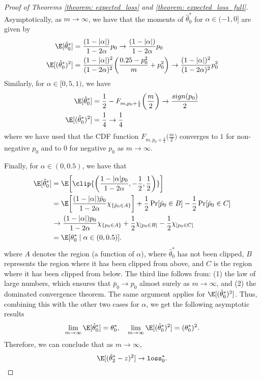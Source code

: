 \begin{proof}[Proof of Theorems \ref{theorem: expected_loss} and \ref{theorem:
    expected_loss_full}]
    Asymptotically, as $m \to \infty$, we have that the moments of
    $\hat{\theta}_0^\ast$ for $\alpha \in (-1, 0]$ are given by
    \begin{align*}
        \E[\hat{\theta}_0^\ast] &= \frac{(1-|\alpha|)}{1-2\alpha} p_0 \to
        \frac{(1-|\alpha|)}{1-2\alpha} p_0\\
        \E[(\hat{\theta}_0^\ast)^2] &= \frac{(1-|\alpha|)^2}{(1-2\alpha)^2}
        \bigg( \frac{0.25 - p_0^2}{m} +  p_0^2\bigg) \to
        \frac{(1-|\alpha|)^2}{(1-2\alpha)^2} p_0^2
    \end{align*}
    Similarly, for $\alpha \in [0,5, 1)$, we have 
    \begin{align*}
        \E[\hat{\theta}_0^\ast] &= \frac12 - F_{m, p_0 +
        \frac12}\bigg(\frac{m}{2}\bigg) \to \frac{sign(p_0)}{2}\\
        \E[(\hat{\theta}_0^\ast)^2] &= \frac14 \to \frac14
    \end{align*}
    where we have used that the CDF function $F_{m, p_0 +
    \frac12}\bigg(\frac{m}{2}\bigg)$ converges to $1$ for non-negative $p_0$
    and to $0$ for negative $p_0$ as $m\to \infty$.

    Finally, for $\alpha \in (0, 0.5)$, we have that 
    \begin{align*}
        \E[\hat{\theta}_0^\ast] &= \E\bigg[\clip{\bigg( \frac{1 - |\alpha|
        p_0}{1-2\alpha}, -\frac12, \frac12 \bigg)}\bigg]\\
        &= \E\bigg[ \frac{(1-|\alpha|)\bar{p}_0}{1-2\alpha}
        \chi_{\{\bar{p}_0 \in A\}} \bigg] + \frac12 \Pr[\bar{p}_0 \in
        B  ] - \frac{1}{2} \Pr[\bar{p}_0 \in C ]\\
        &\to \frac{(1-|\alpha|){p_0}}{1-2\alpha}  \chi_{\{{p_0} \in A\}} +
        \frac12 \chi_{[{p_0} \in B  ]} - \frac{1}{2} \chi_{[{p_0} \in C ]}\\
        &= \E[{\theta}_0^\ast \mid \alpha \in (0, 0.5)].
    \end{align*}
    where $A$ denotes the region (a function of $\alpha$), where
    $\hat{\theta}_0^\ast$ has not been clipped, $B$ represents the region where
    it has been clipped from above, and $C$ is the region where it has been
    clipped from below. The third line follows from: (1) the law of large
    numbers, which ensures that $\bar{p}_0 \to p_0$ almost surely as $m
    \to \infty$, and (2) the dominated convergence theorem. The same argument
    applies for $\E[(\hat{\theta}_0^\ast)^2]$. Thus, combining this with the
    other two cases for $\alpha$, we get the following asymptotic results
    \begin{align*}
        \lim_{m \to \infty} \E[\hat{\theta}_0^\ast] = \theta_0^\ast, \quad
        \lim_{m \to \infty} \E[(\hat{\theta}_0^\ast)^2] = (\theta_0^\ast)^2.
    \end{align*}
    Therefore, we can conclude that as $m\to \infty$,
    \begin{equation*}
        \E[(\hat{\theta}_2^\ast - z)^2] \to \verb|loss|_0^\ast.
    \end{equation*}
\end{proof}



